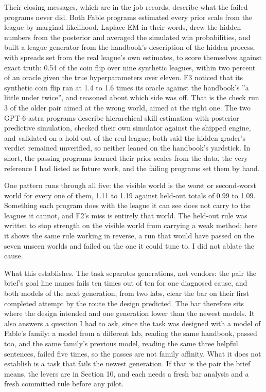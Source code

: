 \documentclass[11pt,letterpaper]{article}
\begin{document}
Their closing messages, which are in the job records, describe what the failed programs never did. Both Fable programs estimated every prior scale from the league by marginal likelihood, Laplace-EM in their words, drew the hidden numbers from the posterior and averaged the simulated win probabilities, and built a league generator from the handbook's description of the hidden process, with spreads set from the real league's own estimates, to score themselves against exact truth: 0.54 of the coin flip over nine synthetic leagues, within two percent of an oracle given the true hyperparameters over eleven. F3 noticed that its synthetic coin flip ran at 1.4 to 1.6 times its oracle against the handbook's ''a little under twice'', and reasoned about which side was off. That is the check run 3 of the older pair aimed at the wrong world, aimed at the right one. The two GPT-6-astra programs describe hierarchical skill estimation with posterior predictive simulation, checked their own simulator against the shipped engine, and validated on a hold-out of the real league; both said the hidden grader's verdict remained unverified, so neither leaned on the handbook's yardstick. In short, the passing programs learned their prior scales from the data, the very reference I had listed as future work, and the failing programs set them by hand.


One pattern runs through all five: the visible world is the worst or second-worst world for every one of them, 1.11 to 1.19 against held-out totals of 0.99 to 1.09. Something each program does with the league it can see does not carry to the leagues it cannot, and F2's miss is entirely that world. The held-out rule was written to stop strength on the visible world from carrying a weak method; here it shows the same rule working in reverse, a run that would have passed on the seven unseen worlds and failed on the one it could tune to. I did not ablate the cause.


What this establishes. The task separates generations, not vendors: the pair the brief's goal line names fails ten times out of ten for one diagnosed cause, and both models of the next generation, from two labs, clear the bar on their first completed attempt by the route the design predicted. The bar therefore sits where the design intended and one generation lower than the newest models. It also answers a question I had to ask, since the task was designed with a model of Fable's family: a model from a different lab, reading the same handbook, passed too, and the same family's previous model, reading the same three helpful sentences, failed five times, so the passes are not family affinity. What it does not establish is a task that fails the newest generation. If that is the pair the brief means, the levers are in Section 10, and each needs a fresh bar analysis and a fresh committed rule before any pilot.
\end{document}
